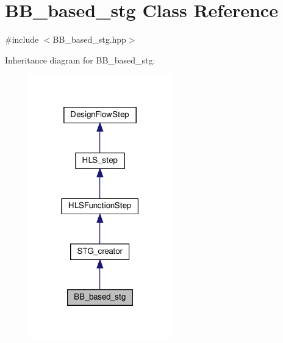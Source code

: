 \hypertarget{classBB__based__stg}{}\section{B\+B\+\_\+based\+\_\+stg Class Reference}
\label{classBB__based__stg}


{\ttfamily \#include $<$B\+B\+\_\+based\+\_\+stg.\+hpp$>$}



Inheritance diagram for B\+B\+\_\+based\+\_\+stg\+:
\nopagebreak
\begin{figure}[H]
\begin{center}
\leavevmode
\includegraphics[width=174pt]{d7/d8f/classBB__based__stg__inherit__graph}
\end{center}
\end{figure}


